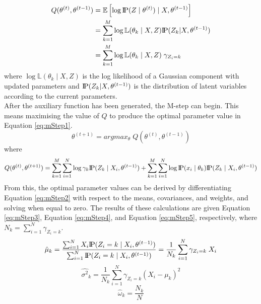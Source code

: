 \begin{align}
    \label{eq:eStep2}
    Q(\theta^{(t)}, \theta^{(t-1)}) &= \mathbb{E}\left[ \log \text{I\kern-0.15em P}(Z \; | \; \theta^{(t)}) \; | \; X, \theta^{(t-1)} \right] \\
    &= \sum^M_{k=1} \log \mathbb{L} (\theta_k \; | \; X, Z) \text{I\kern-0.15em P}(Z_k | X, \theta^{(t-1)}) \\
    &= \sum^M_{k=1} \log \mathbb{L} (\theta_k \; | \; X, Z) \; \gamma_{Z_i = k}
\end{align}
where $\log \mathbb{L} (\theta_k \; | \; X, Z)$ is the log likelihood of a Gaussian component with updated parameters and $\text{I\kern-0.15em P}(Z_k | X, \theta^{(t-1)})$ is the distribution of latent variables according to the current parameters.
\smallskip \\ \indent
After the auxiliary function has been generated, the M-step can begin. This means maximising the value of $Q$ to produce the optimal parameter value in Equation \ref{eq:mStep1}.
\begin{equation}
    \label{eq:mStep1}
    \theta^{(t+1)} = argmax_\theta \; Q(\theta^{(t)}, \theta^{(t-1)})
\end{equation}
where
\begin{equation}
    \label{eq:mStep2}
    Q(\theta^{(t)}, \theta^{(t+1)}) = \sum^M_{k=1} \sum^N_{i=1} \log \gamma_k \text{I\kern-0.15em P}(Z_k \; | \; X_i, \theta^{(t-1)}) + \sum^M_{k=1} \sum^N_{i=1} \log \text{I\kern-0.15em P} (x_i \; | \; \theta_k) \text{I\kern-0.15em P} (Z_k \; | \; X_i, \theta^{(t-1)})
\end{equation}
\indent
From this, the optimal parameter values can be derived by differentiating Equation \ref{eq:mStep2} with respect to the means, covariances, and weights, and solving when equal to zero. The results of these calculations are given Equation \ref{eq:mStep3}, Equation \ref{eq:mStep4}, and Equation \ref{eq:mStep5}, respectively, where $N_k = \sum^N_{i=1} \gamma_{Z_i = k}$.
\begin{equation}
    \label{eq:mStep3}
    \hat{\mu}_k = \frac{\sum^N_{i=1} X_i \text{I\kern-0.15em P}(Z_i = k \; | \; X_i, \theta^{(t-1)})}{\sum^N_{i=1} \text{I\kern-0.15em P}(Z_i = k \; | \; X_i, \theta^{(t-1)})} = \frac{1}{N_k} \sum^N_{i=1} \gamma_{Z_i = k} \; X_i
\end{equation}
\begin{equation}
    \label{eq:mStep4}
    \hat{\sigma^2}_k = \frac{1}{N_k} \sum^N_{i=1} \gamma_{Z_i=k} (X_i - \mu_k)^2
\end{equation}
\begin{equation}
    \label{eq:mStep5}
    \hat{\omega}_k = \frac{N_k}{N}
\end{equation}






